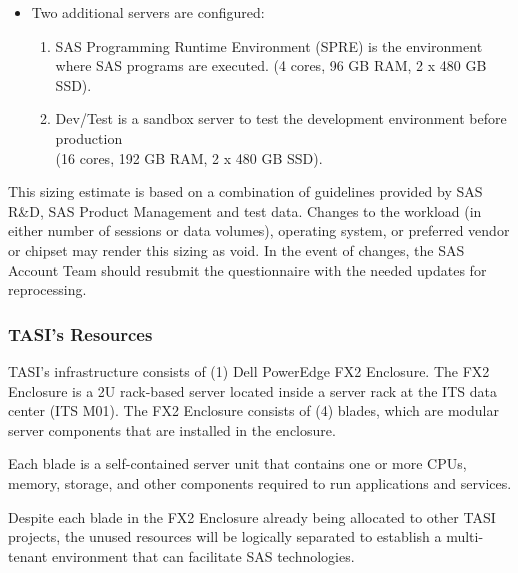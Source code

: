 \begin{enumerate}
\begin{itemize}
        \item Two additional servers are configured: 
        \begin{enumerate}
            \item SAS Programming Runtime Environment (SPRE) is the environment where SAS programs are executed. (4 cores, 96 GB RAM, 2 x 480 GB SSD). 
            \item Dev/Test is a sandbox server to test the development environment before production \\(16 cores, 192 GB RAM, 2 x 480 GB SSD).
        \end{enumerate}
    \end{itemize}
    
\end{enumerate}

This sizing estimate is based on a combination of guidelines provided by SAS R\&D, SAS Product Management and test data. Changes to the workload (in either number of sessions or data volumes), operating system, or preferred vendor or chipset may render this sizing as void. In the event of changes, the SAS Account Team should resubmit the questionnaire with the needed updates for reprocessing. 

\subsubsection{TASI's Resources}

TASI's infrastructure consists of (1) Dell PowerEdge FX2 Enclosure. The FX2 Enclosure is a 2U rack-based server located inside a server rack at the ITS data center (ITS M01). The FX2 Enclosure consists of (4) blades, which are modular server components that are installed in the enclosure. 

Each blade is a self-contained server unit that contains one or more CPUs, memory, storage, and other components required to run applications and services.

Despite each blade in the FX2 Enclosure already being allocated to other TASI projects, the unused resources will be logically separated to establish a multi-tenant environment that can facilitate SAS technologies.

